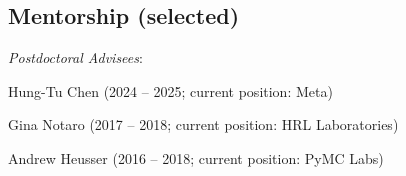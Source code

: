 \documentclass[11pt, a4paper]{article} %
\newcommand{\years}[1]{\marginnote{\footnotesize #1}} %
\begin{document}




\subsection*{Mentorship  (selected)}


\textit{Postdoctoral Advisees}:
\begin{etaremune}  \item Hung-Tu Chen (2024 -- 2025; current position: Meta)
  \item Gina Notaro (2017 -- 2018; current position: HRL Laboratories)
  \item Andrew Heusser (2016 -- 2018; current position: PyMC Labs)\end{etaremune}
\end{document}
